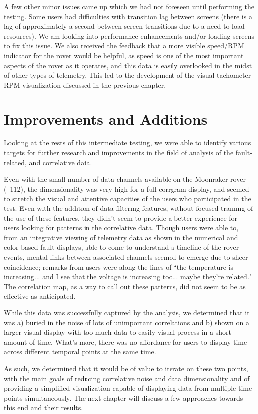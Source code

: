 A few other minor issues came up which we had not foreseen until performing the testing. Some users had difficulties with transition lag between screens (there is a lag of approximately a second between screen transitions due to a need to load resources). We am looking into performance enhancements and/or loading screens to fix this issue. We also received the feedback that a more visible speed/RPM indicator for the rover would be helpful, as speed is one of the most important aspects of the rover as it operates, and this data is easily overlooked in the midst of other types of telemetry. This led to the development of the visual tachometer RPM visualization discussed in the previous chapter.

\section{Improvements and Additions}

Looking at the rests of this intermediate testing, we were able to identify various targets for further research and improvements in the field of analysis of the fault-related, and correlative data.

Even with the small number of data channels available on the Moonraker rover (~112), the dimensionality was very high for a full corrgram display, and seemed to stretch the visual and attentive capacities of the users who participated in the test. Even with the addition of data filtering features, without focused training of the use of these features, they didn't seem to provide a better experience for users looking for patterns in the correlative data. Though users were able to, from an integrative viewing of telemetry data as shown in the numerical and color-based fault displays, able to come to understand a timeline of the rover events, mental links between associated channels seemed to emerge due to sheer coincidence; remarks from users were along the lines of ``the temperature is increasing... and I see that the voltage is increasing too... maybe they're related." The correlation map, as a way to call out these patterns, did not seem to be as effective as anticipated.

While this data was successfully captured by the analysis, we determined that it was a) buried in the noise of lots of unimportant correlations and b) shown on a larger visual display with too much data to easily visual process in a short amount of time. What's more, there was no affordance for users to display time across different temporal points at the same time.

As such, we determined that it would be of value to iterate on these two points, with the main goals of reducing correlative noise and data dimensionality and of providing a simplified visualization capable of displaying data from multiple time points simultaneously. The next chapter will discuss a few approaches towards this end and their results.